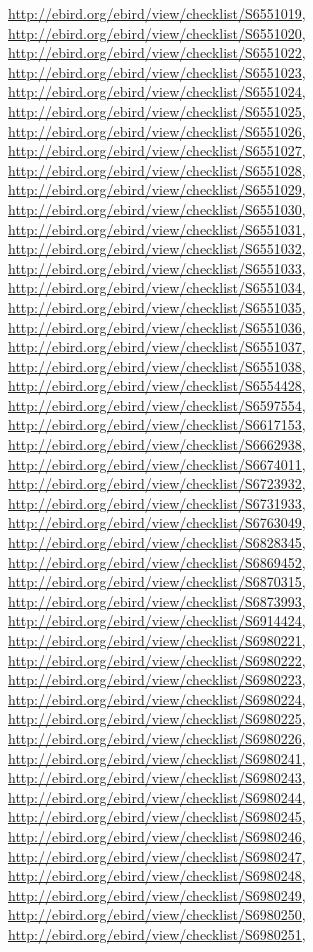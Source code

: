 \documentclass[9pt, article]{memoir}
\begin{document}
\begin{multicols}{2}
\url{http://ebird.org/ebird/view/checklist/S6551019}, 
\url{http://ebird.org/ebird/view/checklist/S6551020}, 
\url{http://ebird.org/ebird/view/checklist/S6551022}, 
\url{http://ebird.org/ebird/view/checklist/S6551023}, 
\url{http://ebird.org/ebird/view/checklist/S6551024}, 
\url{http://ebird.org/ebird/view/checklist/S6551025}, 
\url{http://ebird.org/ebird/view/checklist/S6551026}, 
\url{http://ebird.org/ebird/view/checklist/S6551027}, 
\url{http://ebird.org/ebird/view/checklist/S6551028}, 
\url{http://ebird.org/ebird/view/checklist/S6551029}, 
\url{http://ebird.org/ebird/view/checklist/S6551030}, 
\url{http://ebird.org/ebird/view/checklist/S6551031}, 
\url{http://ebird.org/ebird/view/checklist/S6551032}, 
\url{http://ebird.org/ebird/view/checklist/S6551033}, 
\url{http://ebird.org/ebird/view/checklist/S6551034}, 
\url{http://ebird.org/ebird/view/checklist/S6551035}, 
\url{http://ebird.org/ebird/view/checklist/S6551036}, 
\url{http://ebird.org/ebird/view/checklist/S6551037}, 
\url{http://ebird.org/ebird/view/checklist/S6551038}, 
\url{http://ebird.org/ebird/view/checklist/S6554428}, 
\url{http://ebird.org/ebird/view/checklist/S6597554}, 
\url{http://ebird.org/ebird/view/checklist/S6617153}, 
\url{http://ebird.org/ebird/view/checklist/S6662938}, 
\url{http://ebird.org/ebird/view/checklist/S6674011}, 
\url{http://ebird.org/ebird/view/checklist/S6723932}, 
\url{http://ebird.org/ebird/view/checklist/S6731933}, 
\url{http://ebird.org/ebird/view/checklist/S6763049}, 
\url{http://ebird.org/ebird/view/checklist/S6828345}, 
\url{http://ebird.org/ebird/view/checklist/S6869452}, 
\url{http://ebird.org/ebird/view/checklist/S6870315}, 
\url{http://ebird.org/ebird/view/checklist/S6873993}, 
\url{http://ebird.org/ebird/view/checklist/S6914424}, 
\url{http://ebird.org/ebird/view/checklist/S6980221}, 
\url{http://ebird.org/ebird/view/checklist/S6980222}, 
\url{http://ebird.org/ebird/view/checklist/S6980223}, 
\url{http://ebird.org/ebird/view/checklist/S6980224}, 
\url{http://ebird.org/ebird/view/checklist/S6980225}, 
\url{http://ebird.org/ebird/view/checklist/S6980226}, 
\url{http://ebird.org/ebird/view/checklist/S6980241}, 
\url{http://ebird.org/ebird/view/checklist/S6980243}, 
\url{http://ebird.org/ebird/view/checklist/S6980244}, 
\url{http://ebird.org/ebird/view/checklist/S6980245}, 
\url{http://ebird.org/ebird/view/checklist/S6980246}, 
\url{http://ebird.org/ebird/view/checklist/S6980247}, 
\url{http://ebird.org/ebird/view/checklist/S6980248}, 
\url{http://ebird.org/ebird/view/checklist/S6980249}, 
\url{http://ebird.org/ebird/view/checklist/S6980250}, 
\url{http://ebird.org/ebird/view/checklist/S6980251}, 

\end{multicols}
\end{document}
